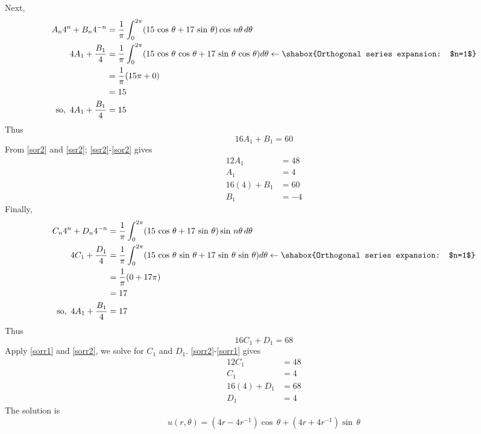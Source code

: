 Next,
\begin{align*}
A_n4^n+B_n4^{-n}&=\frac{1}{\pi}\int_0^{2\pi}(15\,\cos\,\theta+17\,\sin\,\theta)\cos\,n\theta\,d\theta\\
4A_1+\frac{B_1}{4}&=\frac{1}{\pi}\int_0^{2\pi}(15\,\cos\,\theta\,\cos\,\theta+17\,\sin\,\theta\,\cos\,\theta)d\theta\leftarrow\shabox{Orthogonal series expansion: $n=1$}\\
&=\frac{1}{\pi}(15\pi+0)\\
&=15\\
\text{so},\,\,4A_1+\frac{B_1}{4}&=15
\end{align*}
Thus 
\begin{equation}
16A_1+B_1=60\label{ssr2}
\end{equation}
From \eqref{sor2} and \eqref{ssr2}; \eqref{ssr2}-\eqref{sor2} gives
\begin{align*}
12A_1&=48\\
A_1&=4\\
16(4)+B_1&=60\\
B_1&=-4
\end{align*}
Finally, 
\begin{align*}
C_n4^n+D_n4^{-n}&=\frac{1}{\pi}\int_0^{2\pi}(15\,\cos\,\theta+17\,\sin\,\theta)\sin\,n\theta\,d\theta\\
4C_1+\frac{D_1}{4}&=\frac{1}{\pi}\int_0^{2\pi}(15\,\cos\,\theta\,\sin\,\theta+17\,\sin\,\theta\,\sin\,\theta)d\theta\leftarrow\shabox{Orthogonal series expansion: $n=1$}\\
&=\frac{1}{\pi}(0+17\pi)\\
&=17\\
\text{so},\,\,4A_1+\frac{B_1}{4}&=17
\end{align*}
Thus 
\begin{equation}
16C_1+D_1=68\label{sorr2}
\end{equation}
Apply \eqref{sorr1} and \eqref{sorr2}, we solve for $C_1$ and $D_1$. \eqref{sorr2}-\eqref{sorr1} gives
\begin{align*}
12C_1&=48\\
C_1&=4\\
16(4)+D_1&=68\\
D_1&=4
\end{align*}
The solution is
\begin{equation}
u(r,\theta)=(4r-4r^{-1})\cos\,\theta+(4r+4r^{-1})\sin\,\theta
\end{equation}
